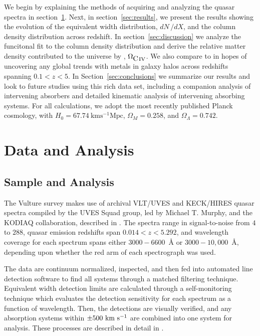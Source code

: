 \documentclass[linenumbers,twocolumn]{aastex61}
\begin{document}
We begin by explaining the methods of acquiring and analyzing the quasar spectra in section~\ref{sec:data}. Next, in section~\ref{sec:results}, we present the results showing the evolution of the {\CIV} equivalent width distribution, $dN\,/dX$, and the {\CIV} column density distribution across redshift. In section~\ref{sec:discussion} we analyze the funcitonal fit to the column density distribution and derive the relative matter density contributed to the universe by {\CIV}, $\Omega_{\hbox{{\rm C}\kern 0.1em{\sc iv}}}$. We also compare {\CIV} to {\MgII} in hopes of uncovering any global trends with metals in galaxy halos across redshifts spanning $0.1 < z < 5$. In Section~\ref{sec:conclusions} we summarize our results and look to future studies using this rich data set, including a companion analysis of intervening {\CIV} absorbers and detailed kinematic analysis of intervening absorbing systems. For all calculations, we adopt the most recently published Planck cosmology, with $H_0 = 67.74~\mathrm{km s^{-1} Mpc}$, $\Omega_M = 0.258$, and $\Omega_{\Lambda} = 0.742$.


\section{Data and Analysis}
\label{sec:data}

\subsection{Sample and Analysis}

The Vulture survey makes use of archival VLT/UVES and KECK/HIRES quasar spectra compiled by the UVES Squad group, led by Michael T. Murphy, and the KODIAQ collaboration, described in \cite{OMeara2015}. The spectra range in signal-to-noise from $4$ to $288$, quasar emission redshifts span $0.014 < z < 5.292$, and wavelength coverage for each spectrum spans either $3000 - 6600$~{\AA} or $3000 - 10,000$~{\AA}, depending upon whether the red arm of each spectrograph was used.

The data are continuum normalized, inspected, and then fed into automated line detection software to find all {\CIVdblt} systems through a matched filtering technique. Equivalent width detection limits are calculated through a self-monitoring technique which evaluates the detection sensitivity for each spectrum as a function of wavelength. Then, the detections are visually verified, and any absorption systems within $\pm 500~{\hbox{km~s$^{-1}$}}$ are combined into one system for analysis. These processes are described in detail in \cite{Mathes2016a}.
\end{document}
